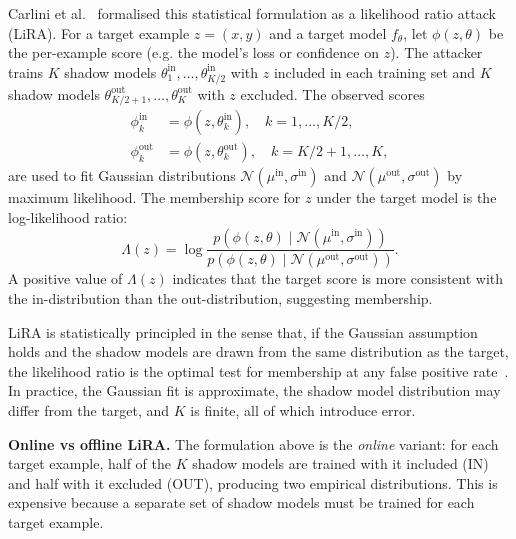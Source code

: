 Carlini et al.~\cite{carlini2022membership} formalised this statistical formulation as a likelihood ratio attack (LiRA). For a target example $z = (x, y)$ and a target model $f_\theta$, let $\phi(z, \theta)$ be the per-example score (e.g. the model's loss or confidence on $z$). The attacker trains $K$ shadow models $\theta_1^{\text{in}}, \ldots, \theta_{K/2}^{\text{in}}$ with $z$ included in each training set and $K$ shadow models $\theta_{K/2+1}^{\text{out}}, \ldots, \theta_K^{\text{out}}$ with $z$ excluded. The observed scores
\begin{align}
  \phi^{\text{in}}_k  &= \phi(z, \theta_k^{\text{in}}),  \quad k = 1, \ldots, {K/2}, \\
  \phi^{\text{out}}_k &= \phi(z, \theta_k^{\text{out}}), \quad k = {K/2+1}, \ldots, K,
\end{align}
are used to fit Gaussian distributions $\mathcal{N}(\mu^{\text{in}},
\sigma^{\text{in}})$ and $\mathcal{N}(\mu^{\text{out}}, \sigma^{\text{out}})$
by maximum likelihood. The membership score for $z$ under the target model is the log-likelihood ratio:
\begin{equation}
  \Lambda(z) = \log \frac{p(\phi(z, \theta) \mid \mathcal{N}(\mu^{\text{in}},
  \sigma^{\text{in}}))}{p(\phi(z, \theta) \mid \mathcal{N}(\mu^{\text{out}},
  \sigma^{\text{out}}))}.
  \label{eq:lira}
\end{equation}
A positive value of $\Lambda(z)$ indicates that the target score is more consistent with the in-distribution than the out-distribution, suggesting membership.

LiRA is statistically principled in the sense that, if the Gaussian assumption holds and the shadow models are drawn from the same distribution as the target, the likelihood ratio is the optimal test for membership at any false positive rate~\cite{carlini2022membership}. In practice, the Gaussian fit is approximate, the shadow model distribution may differ from the target, and $K$ is finite, all of which introduce error.

\noindent\textbf{Online vs offline LiRA.}
The formulation above is the \emph{online} variant: for each target example, half of the $K$ shadow models are trained with it included (IN) and half with it excluded (OUT), producing two empirical distributions. This is expensive because a separate set of shadow models must be trained for each target example.


